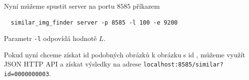Nyní můžeme spustit server na portu $8585$ příkazem

\begin{lstlisting}
  similar_img_finder server -p 8585 -l 100 -e 9200
\end{lstlisting}

Parametr \lstinline{-l} odpovídá hodnotě $L$.

Pokud nyní chceme získat id podobných obrázků k obrázku s id , můžeme využít JSON HTTP API a získat výsledky na adrese \lstinline{localhost:8585/similar?id=0000000003}.





